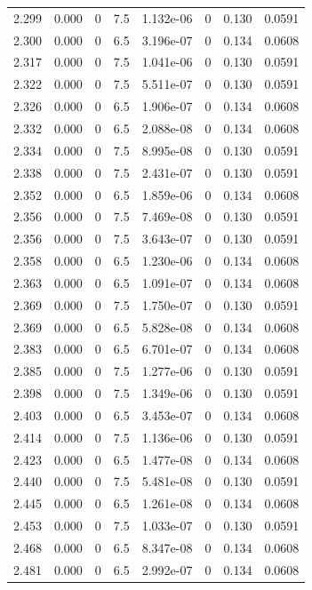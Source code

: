 \documentclass[preview]{standalone}
\begin{document}
{{{{{{{\begin{tabular}{L{1.2cm}C{1.2cm} C{0.3cm}C{0.5cm} C{1.4cm}C{1.4cm} C{1.4cm}C{1.4cm}}
  2.299  &  0.000  & 0     & 7.5 &  1.132e-06  & 0  & 0.130 &  0.0591   \\ 
  2.300  &  0.000  & 0     & 6.5 &  3.196e-07  & 0  & 0.134 &  0.0608   \\ 
  2.317  &  0.000  & 0     & 7.5 &  1.041e-06  & 0  & 0.130 &  0.0591   \\ 
  2.322  &  0.000  & 0     & 7.5 &  5.511e-07  & 0  & 0.130 &  0.0591   \\ 
  2.326  &  0.000  & 0     & 6.5 &  1.906e-07  & 0  & 0.134 &  0.0608   \\ 
  2.332  &  0.000  & 0     & 6.5 &  2.088e-08  & 0  & 0.134 &  0.0608   \\ 
  2.334  &  0.000  & 0     & 7.5 &  8.995e-08  & 0  & 0.130 &  0.0591   \\ 
  2.338  &  0.000  & 0     & 7.5 &  2.431e-07  & 0  & 0.130 &  0.0591   \\ 
  2.352  &  0.000  & 0     & 6.5 &  1.859e-06  & 0  & 0.134 &  0.0608   \\ 
  2.356  &  0.000  & 0     & 7.5 &  7.469e-08  & 0  & 0.130 &  0.0591   \\ 
  2.356  &  0.000  & 0     & 7.5 &  3.643e-07  & 0  & 0.130 &  0.0591   \\ 
  2.358  &  0.000  & 0     & 6.5 &  1.230e-06  & 0  & 0.134 &  0.0608   \\ 
  2.363  &  0.000  & 0     & 6.5 &  1.091e-07  & 0  & 0.134 &  0.0608   \\ 
  2.369  &  0.000  & 0     & 7.5 &  1.750e-07  & 0  & 0.130 &  0.0591   \\ 
  2.369  &  0.000  & 0     & 6.5 &  5.828e-08  & 0  & 0.134 &  0.0608   \\ 
  2.383  &  0.000  & 0     & 6.5 &  6.701e-07  & 0  & 0.134 &  0.0608   \\ 
  2.385  &  0.000  & 0     & 7.5 &  1.277e-06  & 0  & 0.130 &  0.0591   \\ 
  2.398  &  0.000  & 0     & 7.5 &  1.349e-06  & 0  & 0.130 &  0.0591   \\ 
  2.403  &  0.000  & 0     & 6.5 &  3.453e-07  & 0  & 0.134 &  0.0608   \\ 
  2.414  &  0.000  & 0     & 7.5 &  1.136e-06  & 0  & 0.130 &  0.0591   \\ 
  2.423  &  0.000  & 0     & 6.5 &  1.477e-08  & 0  & 0.134 &  0.0608   \\ 
  2.440  &  0.000  & 0     & 7.5 &  5.481e-08  & 0  & 0.130 &  0.0591   \\ 
  2.445  &  0.000  & 0     & 6.5 &  1.261e-08  & 0  & 0.134 &  0.0608   \\ 
  2.453  &  0.000  & 0     & 7.5 &  1.033e-07  & 0  & 0.130 &  0.0591   \\ 
  2.468  &  0.000  & 0     & 6.5 &  8.347e-08  & 0  & 0.134 &  0.0608   \\ 
  2.481  &  0.000  & 0     & 6.5 &  2.992e-07  & 0  & 0.134 &  0.0608   \\ 
\hline 
\end{tabular} 

}}}}}}}
\end{document}
